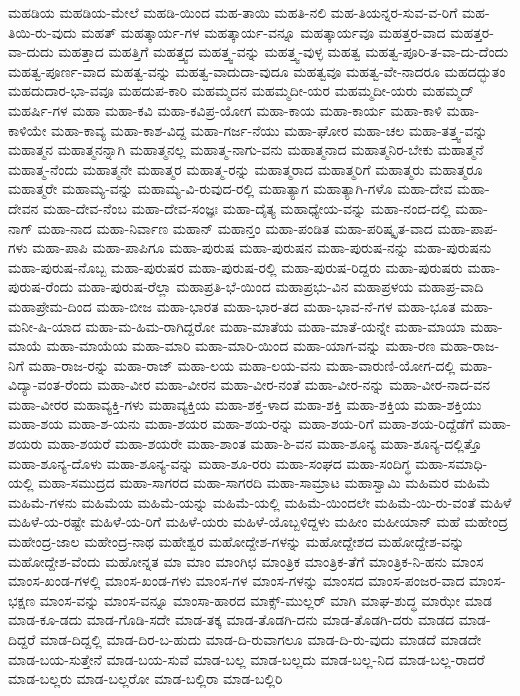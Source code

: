 {ಮಹಡಿಯ
ಮಹಡಿಯ-ಮೇಲೆ
ಮಹಡಿ-ಯಿಂದ
ಮಹ-ತಾಯಿ
ಮಹತಿ-ನಲಿ
ಮಹ-ತಿಯನ್ನರ-ಸುವ-ವ-ರಿಗೆ
ಮಹ-ತಿಯಿ-ರು-ವುದು
ಮಹತ್
ಮಹತ್ಕಾರ್ಯ-ಗಳ
ಮಹತ್ಕಾರ್ಯ-ವನ್ನೂ
ಮಹತ್ಕಾರ್ಯವೂ
ಮಹತ್ತರ-ವಾದ
ಮಹತ್ತರ-ವಾ-ದುದು
ಮಹತ್ತಾದ
ಮಹತ್ತಿಗೆ
ಮಹತ್ತ್ವದ
ಮಹತ್ತ್ವ-ವನ್ನು
ಮಹತ್ತ್ವ-ವುಳ್ಳ
ಮಹತ್ವ
ಮಹತ್ವ-ಪೂರಿ-ತ-ವಾ-ದು-ದೆಂದು
ಮಹತ್ವ-ಪೂರ್ಣ-ವಾದ
ಮಹತ್ವ-ವನ್ನು
ಮಹತ್ವ-ವಾದುದಾ-ವುದೂ
ಮಹತ್ವವೂ
ಮಹತ್ವ-ವೇ-ನಾದರೂ
ಮಹದದ್ಭುತಂ
ಮಹದುದಾರ-ಭಾ-ವವೂ
ಮಹದುಪ-ಕಾರಿ
ಮಹಮ್ಮದನ
ಮಹಮ್ಮದೀ-ಯರ
ಮಹಮ್ಮದೀ-ಯರು
ಮಹಮ್ಮದ್
ಮಹರ್ಷಿ-ಗಳ
ಮಹಾ
ಮಹಾ-ಕವಿ
ಮಹಾ-ಕವಿಪ್ರ-ಯೋಗ
ಮಹಾ-ಕಾಯ
ಮಹಾ-ಕಾರ್ಯ
ಮಹಾ-ಕಾಳಿ
ಮಹಾ-ಕಾಳಿಯೇ
ಮಹಾ-ಕಾವ್ಯ
ಮಹಾ-ಕಾಶ-ವಿದ್ದ
ಮಹಾ-ಗರ್ಜ-ನೆಯು
ಮಹಾ-ಘೋರ
ಮಹಾ-ಚಲ
ಮಹಾ-ತತ್ತ್ವ-ವನ್ನು
ಮಹಾತ್ಮನ
ಮಹಾತ್ಮನನ್ನಾಗಿ
ಮಹಾತ್ಮನಲ್ಲ
ಮಹಾತ್ಮ-ನಾಗು-ವನು
ಮಹಾತ್ಮನಾದ
ಮಹಾತ್ಮನಿರ-ಬೇಕು
ಮಹಾತ್ಮನೆ
ಮಹಾತ್ಮ-ನೆಂದು
ಮಹಾತ್ಮನೇ
ಮಹಾತ್ಮರ
ಮಹಾತ್ಮ-ರನ್ನು
ಮಹಾತ್ಮರಾದ
ಮಹಾತ್ಮರಿಗೆ
ಮಹಾತ್ಮರು
ಮಹಾತ್ಮರೂ
ಮಹಾತ್ಮರೇ
ಮಹಾಮ್ಯ-ವನ್ನು
ಮಹಾಮ್ಯ-ವಿ-ರುವುದ-ರಲ್ಲಿ
ಮಹಾತ್ಯಾಗ
ಮಹಾತ್ಯಾಗಿ-ಗಳೊ
ಮಹಾ-ದೇವ
ಮಹಾ-ದೇವನ
ಮಹಾ-ದೇವ-ನೆಂಬ
ಮಹಾ-ದೇವ-ಸಂಜ್ಞಃ
ಮಹಾ-ದೈತ್ಯ
ಮಹಾಧ್ಯೇಯ-ವನ್ನು
ಮಹಾ-ನಂದ-ದಲ್ಲಿ
ಮಹಾ-ನಾಗ್
ಮಹಾ-ನಾದ
ಮಹಾ-ನಿರ್ವಾಣ
ಮಹಾನ್
ಮಹಾನ್ತಂ
ಮಹಾ-ಪಂಡಿತ
ಮಹಾ-ಪರಿಷ್ಕೃತ-ವಾದ
ಮಹಾ-ಪಾಪ-ಗಳು
ಮಹಾ-ಪಾಪಿ
ಮಹಾ-ಪಾಪಿಗೂ
ಮಹಾ-ಪುರುಷ
ಮಹಾ-ಪುರುಷನ
ಮಹಾ-ಪುರುಷ-ನನ್ನು
ಮಹಾ-ಪುರುಷನು
ಮಹಾ-ಪುರುಷ-ನೊಬ್ಬ
ಮಹಾ-ಪುರುಷರ
ಮಹಾ-ಪುರುಷ-ರಲ್ಲಿ
ಮಹಾ-ಪುರುಷ-ರಿದ್ದರು
ಮಹಾ-ಪುರುಷರು
ಮಹಾ-ಪುರುಷ-ರೆಂದು
ಮಹಾ-ಪುರುಷ-ರೆಲ್ಲಾ
ಮಹಾಪ್ರತಿ-ಭೆ-ಯಿಂದ
ಮಹಾಪ್ರಭು-ವಿನ
ಮಹಾಪ್ರಳಯ
ಮಹಾಪ್ರ-ವಾದಿ
ಮಹಾಪ್ರೇಮ-ದಿಂದ
ಮಹಾ-ಬೀಜ
ಮಹಾ-ಭಾರತ
ಮಹಾ-ಭಾರ-ತದ
ಮಹಾ-ಭಾವ-ನೆ-ಗಳ
ಮಹಾ-ಭೂತ
ಮಹಾ-ಮನೀ-ಷಿ-ಯಾದ
ಮಹಾ-ಮ-ಹಿಮ-ರಾಗಿದ್ದರೋ
ಮಹಾ-ಮಾತೆಯ
ಮಹಾ-ಮಾತೆ-ಯನ್ನೇ
ಮಹಾ-ಮಾಯಾ
ಮಹಾ-ಮಾಯೆ
ಮಹಾ-ಮಾಯೆಯ
ಮಹಾ-ಮಾರಿ
ಮಹಾ-ಮಾರಿ-ಯಿಂದ
ಮಹಾ-ಯಾಗ-ವನ್ನು
ಮಹಾ-ರಣ
ಮಹಾ-ರಾಜ-ನಿಗೆ
ಮಹಾ-ರಾಜ-ರನ್ನು
ಮಹಾ-ರಾಜ್
ಮಹಾ-ಲಯ
ಮಹಾ-ಲಯ-ವನು
ಮಹಾ-ವಾರುಣಿ-ಯೋಗ-ದಲ್ಲಿ
ಮಹಾ-ವಿದ್ಯಾ-ವಂತ-ರೆಂದು
ಮಹಾ-ವೀರ
ಮಹಾ-ವೀರನ
ಮಹಾ-ವೀರ-ನಂತೆ
ಮಹಾ-ವೀರ-ನನ್ನು
ಮಹಾ-ವೀರ-ನಾದ-ವನ
ಮಹಾ-ವೀರರ
ಮಹಾವ್ಯಕ್ತಿ-ಗಳು
ಮಹಾವ್ಯಕ್ತಿಯ
ಮಹಾ-ಶಕ್ತ-ಳಾದ
ಮಹಾ-ಶಕ್ತಿ
ಮಹಾ-ಶಕ್ತಿಯ
ಮಹಾ-ಶಕ್ತಿಯು
ಮಹಾ-ಶಯ
ಮಹಾ-ಶ-ಯನು
ಮಹಾ-ಶಯರ
ಮಹಾ-ಶಯ-ರನ್ನು
ಮಹಾ-ಶಯ-ರಿಗೆ
ಮಹಾ-ಶಯ-ರಿದ್ದೆಡೆಗೆ
ಮಹಾ-ಶಯರು
ಮಹಾ-ಶಯರೆ
ಮಹಾ-ಶಯರೇ
ಮಹಾ-ಶಾಂತ
ಮಹಾ-ಶಿ-ವನ
ಮಹಾ-ಶೂನ್ಯ
ಮಹಾ-ಶೂನ್ಯ-ದಲ್ಲಿತ್ತೊ
ಮಹಾ-ಶೂನ್ಯ-ದೊಳು
ಮಹಾ-ಶೂನ್ಯ-ವನ್ನು
ಮಹಾ-ಶೂ-ರರು
ಮಹಾ-ಸಂಘದ
ಮಹಾ-ಸಂದಿಗ್ಧ
ಮಹಾ-ಸಮಾಧಿ-ಯಲ್ಲಿ
ಮಹಾ-ಸಮುದ್ರದ
ಮಹಾ-ಸಾಗರದ
ಮಹಾ-ಸಾಗರದಿ
ಮಹಾ-ಸಾಮ್ರಾಟ
ಮಹಾಸ್ವಾಮಿ
ಮಹಿಮರ
ಮಹಿಮೆ
ಮಹಿಮೆ-ಗಳನು
ಮಹಿಮೆಯ
ಮಹಿಮೆ-ಯನ್ನು
ಮಹಿಮೆ-ಯಲ್ಲಿ
ಮಹಿಮೆ-ಯಿಂದಲೇ
ಮಹಿಮೆ-ಯಿ-ರು-ವಂತೆ
ಮಹಿಳೆ
ಮಹಿಳೆ-ಯ-ರಷ್ಟೇ
ಮಹಿಳೆ-ಯ-ರಿಗೆ
ಮಹಿಳೆ-ಯರು
ಮಹಿಳೆ-ಯೊಬ್ಬಳಿದ್ದಳು
ಮಹೀಂ
ಮಹೀಯಾನ್
ಮಹೆ
ಮಹೇಂದ್ರ
ಮಹೇಂದ್ರ-ಜಾಲ
ಮಹೇಂದ್ರ-ನಾಥ
ಮಹೇಶ್ವರ
ಮಹೋದ್ದೇಶ-ಗಳನ್ನು
ಮಹೋದ್ದೇಶದ
ಮಹೋದ್ದೇಶ-ವನ್ನು
ಮಹೋದ್ದೇಶ-ವೆಂದು
ಮಹೋನ್ನತ
ಮಾ
ಮಾಂ
ಮಾಂಗಿಛ
ಮಾಂತ್ರಿಕ
ಮಾಂತ್ರಿಕ-ತೆಗೆ
ಮಾಂತ್ರಿಕ-ನಿ-ಹನು
ಮಾಂಸ
ಮಾಂಸ-ಖಂಡ-ಗಳಲ್ಲಿ
ಮಾಂಸ-ಖಂಡ-ಗಳು
ಮಾಂಸ-ಗಳ
ಮಾಂಸ-ಗಳನ್ನು
ಮಾಂಸದ
ಮಾಂಸ-ಪಂಜರ-ವಾದ
ಮಾಂಸ-ಭಕ್ಷಣ
ಮಾಂಸ-ವನ್ನು
ಮಾಂಸ-ವನ್ನೂ
ಮಾಂಸಾ-ಹಾರದ
ಮಾಕ್ಸ್-ಮುಲ್ಲರ್
ಮಾಗಿ
ಮಾಘ-ಶುದ್ಧ
ಮಾಝೇ
ಮಾಡ
ಮಾಡ-ಕೂ-ಡದು
ಮಾಡ-ಗೊಡಿ-ಸದೇ
ಮಾಡ-ತಕ್ಕ
ಮಾಡ-ತೊಡಗಿ-ದನು
ಮಾಡ-ತೊಡಗಿ-ದರು
ಮಾಡದ
ಮಾಡ-ದಿದ್ದರೆ
ಮಾಡ-ದಿದ್ದಲ್ಲಿ
ಮಾಡ-ದಿರ-ಬ-ಹುದು
ಮಾಡ-ದಿ-ರುವಾಗಲೂ
ಮಾಡ-ದಿ-ರು-ವುದು
ಮಾಡದೆ
ಮಾಡದೇ
ಮಾಡ-ಬಯ-ಸುತ್ತೇನೆ
ಮಾಡ-ಬಯ-ಸುವೆ
ಮಾಡ-ಬಲ್ಲ
ಮಾಡ-ಬಲ್ಲದು
ಮಾಡ-ಬಲ್ಲ-ನಿದ
ಮಾಡ-ಬಲ್ಲ-ರಾದರೆ
ಮಾಡ-ಬಲ್ಲರು
ಮಾಡ-ಬಲ್ಲರೋ
ಮಾಡ-ಬಲ್ಲಿರಾ
ಮಾಡ-ಬಲ್ಲಿರಿ
}

